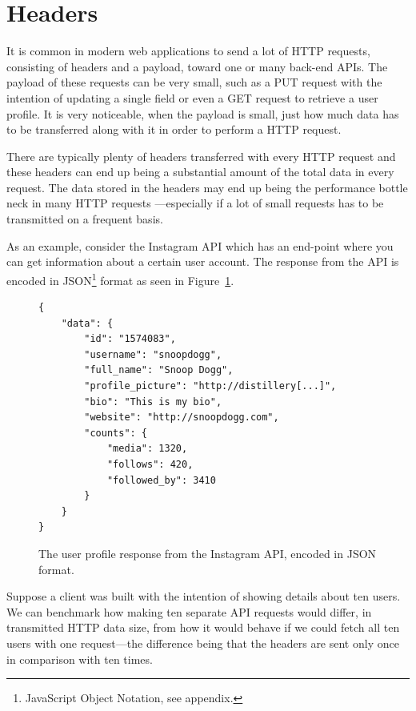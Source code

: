 \documentclass{cslthse-msc}
\begin{document}
\section{Headers}
\label{headers}

It is common in modern web applications to send a lot of HTTP requests, consisting of headers and a payload, toward one or many back-end APIs. The payload of these requests can be very small, such as a PUT request with the intention of updating a single field or even a GET request to retrieve a user profile. It is very noticeable, when the payload is small, just how much data has to be transferred along with it in order to perform a HTTP request.

There are typically plenty of headers transferred with every HTTP request and these headers can end up being a substantial amount of the total data in every request. The data stored in the headers may end up being the performance bottle neck in many HTTP requests \cite{rfc6202}---especially if a lot of small requests has to be transmitted on a frequent basis.

As an example, consider the Instagram API \cite{instagram_api} which has an end-point where you can get information about a certain user account. The response from the API is encoded in JSON\footnote{JavaScript Object Notation, see appendix.} format as seen in Figure~\ref{fig:user_json}.

\begin{figure}[H]
  \centering
\begin{lstlisting}
{
    "data": {
        "id": "1574083",
        "username": "snoopdogg",
        "full_name": "Snoop Dogg",
        "profile_picture": "http://distillery[...]",
        "bio": "This is my bio",
        "website": "http://snoopdogg.com",
        "counts": {
            "media": 1320,
            "follows": 420,
            "followed_by": 3410
        }
    }
}
\end{lstlisting}
  \caption{The user profile response from the Instagram API, encoded in JSON format.}
  \label{fig:user_json}
\end{figure}

\clearpage

Suppose a client was built with the intention of showing details about ten users. We can benchmark how making ten separate API requests would differ, in transmitted HTTP data size, from how it would behave if we could fetch all ten users with one request---the difference being that the headers are sent only once in comparison with ten times.
\end{document}
